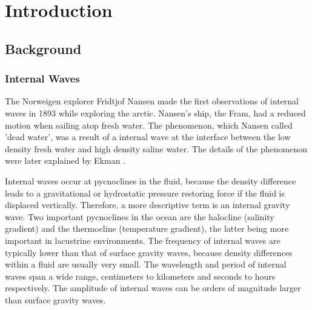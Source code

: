 
\chapter{Introduction}
\label{intro_chapter}

\section{Background}

\subsection{Internal Waves}
\begin{comment}
discuss first observations of internal waves and what an internal wave actually is. 
\end{comment}

The Norweigen explorer Fridtjof Nansen made the first observations of
internal waves in 1893 while exploring the arctic. %
Nansen's ship, the Fram, had a reduced motion when sailing atop fresh water. 
The phenomenon, which Nansen called 'dead water', was a result of a internal wave at the interface between
the low density fresh water and high density saline water.  The details of the phenomenon were later explained by Ekman \citep{ekman1904dead}. 

Internal waves occur at pycnoclines in the fluid, because the density difference leads to a gravitational or hydrostatic pressure restoring force
 if the fluid is displaced vertically. Therefore, a more descriptive term is an internal gravity wave.  
 Two important pycnoclines in the ocean are the halocline (salinity gradient) and the thermocline (temperature gradient), 
 the latter being more important in lacustrine environments. The frequency  of internal waves are typically lower than that of surface gravity waves, 
 because density differences within a fluid are usually very small. The wavelength and period of internal waves span a wide range, centimeters to 
 kilometers and seconds to hours respectively. The amplitude of internal waves can be orders of magnitude larger than surface gravity waves. 


